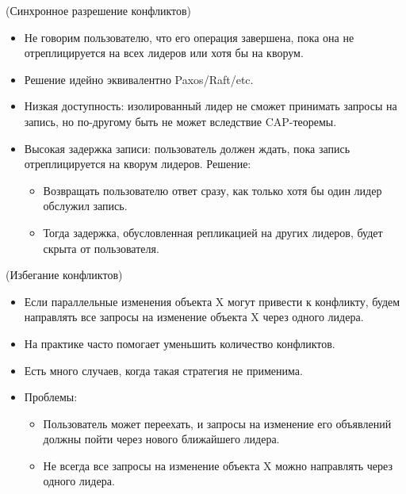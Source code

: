 \begin{algorithm}(Синхронное разрешение конфликтов)
    \begin{itemize}
        \item Не говорим пользователю, что его операция завершена, пока она не отреплицируется на всех лидеров или хотя бы на кворум.
        \item Решение идейно эквивалентно Paxos/Raft/etc.
        \item Низкая доступность: изолированный лидер не сможет принимать запросы на запись, но по-другому быть не может вследствие CAP-теоремы.

        \item Высокая задержка записи: пользователь должен ждать, пока запись отреплицируется на кворум лидеров. Решение:
        \begin{itemize}
            \item Возвращать пользователю ответ сразу, как только хотя бы один лидер обслужил запись.
            \item Тогда задержка, обусловленная репликацией на других лидеров, будет скрыта от пользователя.
        \end{itemize}
    \end{itemize}

\end{algorithm}

\newpage

\begin{algorithm}(Избегание конфликтов)
    \begin{itemize}
        \item Если параллельные изменения объекта X могут привести к конфликту, будем направлять все запросы на изменение объекта X через одного лидера.
        \item На практике часто помогает уменьшить количество конфликтов.
        \item Есть много случаев, когда такая стратегия не применима.
        \item Проблемы:
        \begin{itemize}
            \item Пользователь может переехать, и запросы на изменение его объявлений должны пойти через нового ближайшего лидера.
            \item Не всегда все запросы на изменение объекта X можно направлять через одного лидера.
        \end{itemize}
    \end{itemize}

\end{algorithm}

